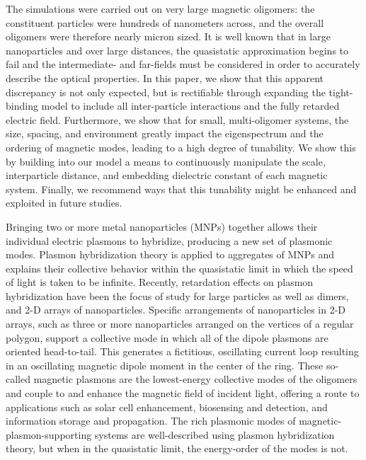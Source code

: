 \documentclass[journal=apchd5,manuscript=article]{achemso}
\begin{document}
The simulations were carried out on very large magnetic oligomers: the constituent particles were hundreds of nanometers across, and the overall oligomers were therefore nearly micron sized. It is well known that in large nanoparticles and over large distances, the quasistatic approximation begins to fail and the intermediate- and far-fields must be considered in order to accurately describe the optical properties. In this paper, we show that this apparent discrepancy is not only expected, but is rectifiable through expanding the tight-binding model to include all inter-particle interactions and the fully retarded electric field. Furthermore, we show that for small, multi-oligomer systems, the size, spacing, and environment greatly impact the eigenspectrum and the ordering of magnetic modes, leading to a high degree of tunability. We show this by building into our model a means to continuously manipulate the scale, interparticle distance, and embedding dielectric constant of each magnetic system. Finally, we recommend ways that this tunability might be enhanced and exploited in future studies. 



Bringing two or more metal nanoparticles (MNPs) together allows their individual electric plasmons to hybridize, producing a new set of plasmonic modes\cite{Lucas1976,ARAVIND1981,Xu1995,Mischenko1995}. Plasmon hybridization theory is applied to aggregates of MNPs and explains their collective behavior within the quasistatic limit in which the speed of light is taken to be infinite\cite{NordHal2003,NordProdan2004,Oubre2004,Gomez2009}. Recently, retardation effects on plasmon hybridization have been the focus of study for large particles\cite{Abajo2008,Gu2010} as well as dimers\cite{vonPlessen2007,Rechbacher2003,Kottman2001}, and 2-D arrays\cite{Schatz2003,Royer2005,Chumanov2010} of nanoparticles. Specific arrangements of nanoparticles in 2-D arrays, such as three or more nanoparticles arranged on the vertices of a regular polygon, support a collective mode in which all of the dipole plasmons are oriented head-to-tail. This generates a fictitious, oscillating current loop resulting in an oscillating magnetic dipole moment in the center of the ring\cite{Alu2006,Alu2008,Liu2011,Nord2006,Cherqui2014,Cherqui2016}. These so-called magnetic plasmons are the lowest-energy collective modes of the oligomers and couple to and enhance the magnetic field of incident light\cite{Shalaev2007,Qian2015,Nord2007}, offering a route to applications such as solar cell enhancement\cite{Graydon2011,Alu2014solar,Le2015solar}, biosensing and detection\cite{Zia2010trans,Noginova2008trans,Wang:13,Fan2015,Wei2015,Shvets2012,Altug2012bio,Nord2011fano}, and information storage and propagation\cite{Zhang2006,NordHal2011,NordHal2012}. The rich plasmonic modes of magnetic-plasmon-supporting systems are well-described using plasmon hybridization theory, but when in the quasistatic limit, the energy-order of the modes is not.
\end{document}
